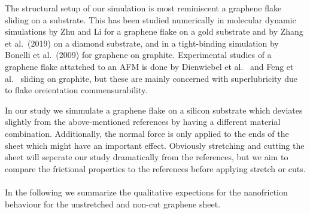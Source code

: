 
The structural setup of our simulation is most reminiscent a graphene flake sliding on a substrate. This has been studied numerically in molecular dynamic simulations by Zhu and Li \cite[2018]{zhu_study_2018} for a graphene flake on a gold substrate and by Zhang et al.\ \cite{ma12091425}(2019) on a diamond substrate, and in a tight-binding simulation by Bonelli et al.\ \cite{bonelli_atomistic_2009}(2009) for graphene on graphite. Experimental studies of a graphene flake attatched to an AFM is done by Dienwiebel et al.\ \cite[2005]{DIENWIEBEL2005197} and Feng et al.\ \cite[2013]{feng_superlubric_2013} sliding on graphite, but these are mainly concerned with superlubricity due to flake oreientation commensurability. 

In our study we simmulate a graphene flake on a silicon substrate which deviates slightly from the above-mentioned references by having a different material combination. Additionally, the normal force is only applied to the ends of the sheet which might have an important effect. Obviously stretching and cutting the sheet will seperate our study dramatically from the references, but we aim to compare the frictional properties to the references before applying stretch or cuts. 
\\
\\
In the following we summarize the qualitative expections for the nanofriction behaviour for the unstretched and non-cut graphene sheet.
